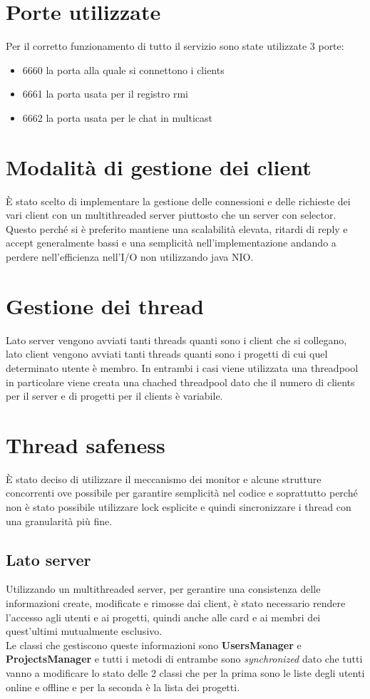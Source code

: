 \documentclass[11pt]{report}
\begin{document}
	\section{Porte utilizzate}
	Per il corretto funzionamento di tutto il servizio sono state utilizzate 3 porte:
	\begin{itemize}
		\item 6660 la porta alla quale si connettono i clients
		\item 6661 la porta usata per il registro rmi
		\item 6662 la porta usata per le chat in multicast
	\end{itemize}
	
	\section{Modalità di gestione dei client}
	È stato scelto di implementare la gestione delle connessioni e delle richieste dei vari client con un multithreaded server piuttosto che un server con selector.
	Questo perché si è preferito mantiene una scalabilità elevata, ritardi di reply e accept generalmente bassi e una semplicità nell'implementazione andando a perdere nell'efficienza nell'I/O non utilizzando java NIO.
	
	\section{Gestione dei thread}
	Lato server vengono avviati tanti threads quanti sono i client che si collegano, lato client vengono avviati tanti threads quanti sono i progetti di cui quel determinato utente è membro.
	In entrambi i casi viene utilizzata una threadpool in particolare viene creata una chached threadpool dato che il numero di clients per il server e di progetti per il clients è variabile.
	
	\section{Thread safeness}
	È stato deciso di utilizzare il meccanismo dei monitor e alcune strutture concorrenti ove possibile per garantire semplicità nel codice e soprattutto perché non è stato possibile utilizzare lock esplicite e quindi sincronizzare i thread con una granularità più fine.
	
	\subsection{Lato server}
	Utilizzando un multithreaded server, per gerantire una consistenza delle informazioni create, modificate e rimosse dai client, è stato necessario rendere l'accesso agli utenti e ai progetti, quindi anche alle card e ai membri dei quest'ultimi mutualmente esclusivo.\\
	Le classi che gestiscono queste informazioni sono \textbf{UsersManager} e \textbf{ProjectsManager} e tutti i metodi di entrambe sono \textit{synchronized} dato che tutti vanno a modificare lo stato delle 2 classi che per la prima sono le liste degli utenti online e offline e per la seconda è la lista dei progetti. 
	
\end{document}

